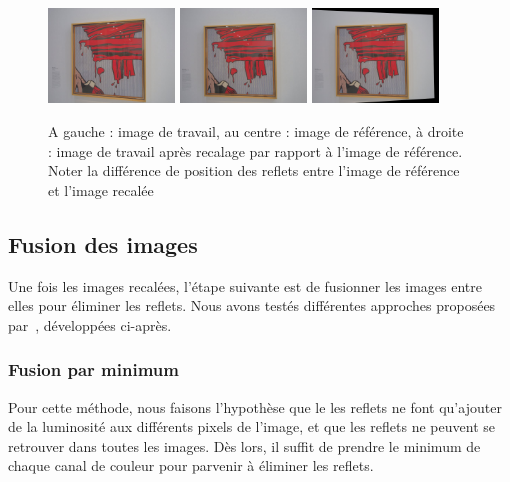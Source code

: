 \documentclass[12pt,a4paper]{article}
\begin{document}
\begin{figure}[H]
  \centering
  \includegraphics[width=0.30\textwidth]{Fig/working.png}
  \includegraphics[width=0.30\textwidth]{Fig/reference_image.png}
  \includegraphics[width=0.30\textwidth]{Fig/fitted.png}

  \caption{A gauche : image de travail, au centre : image de référence, à droite : image de travail après recalage par rapport à l'image de référence. Noter la différence de position des reflets entre l'image de référence et l'image recalée}
\end{figure}

\subsection{Fusion des images}
Une fois les images recalées, l'étape suivante est de fusionner les images entre elles pour éliminer les reflets. Nous avons testés différentes approches proposées par~\citep{haro2012photographing}, développées ci-après.
\subsubsection{Fusion par minimum}
Pour cette méthode, nous faisons l'hypothèse que le les reflets ne font qu'ajouter de la luminosité aux différents pixels de l'image, et que les reflets ne peuvent se retrouver dans toutes les images. Dès lors, il suffit de prendre le minimum de chaque canal de couleur pour parvenir à éliminer les reflets.
\end{document}

